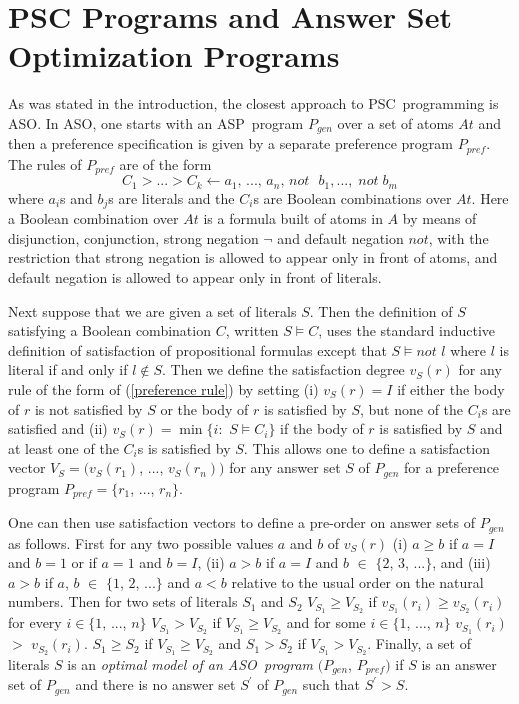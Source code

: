 \documentclass[letterpaper]{article}\usepackage{aaai}
\begin{document}
\section{PSC Programs and Answer Set Optimization Programs}

As was stated in the introduction, the closest approach to PSC\ programming is
ASO. In ASO, one starts with an ASP\ program $P_{gen}$ over a set of atoms
$At$ and then a preference specification is given by a separate preference
program $P_{pref}$. The rules of $P_{pref}$ are of the form\begin{equation}
C_{1}>...>C_{k}\leftarrow a_{1}\text{, ..., }a_{n}\text{, }not\text{ }b_{1},...,\;not\;b_{m} \label{preference rule}\end{equation}
where $a_{i}$s and $b_{j}$s are literals and the $C_{i}$s are Boolean
combinations over $At$. Here a Boolean combination over $At$ is a formula
built of atoms in $A$ by means of disjunction, conjunction, strong negation
$\lnot$ and default negation $not$, with the restriction that strong negation
is allowed to appear only in front of atoms, and default negation is allowed
to appear only in front of literals.

Next suppose that we are given a set of literals $S$. Then the definition of
$S$ satisfying a Boolean combination $C$, written $S\models C$, uses the
standard inductive definition of satisfaction of propositional formulas except
that $S\models not$ $l$ where $l$ is literal if and only if $l\notin S$. Then
we define the satisfaction degree $v_{S}\left(  r\right)  $ for any rule of
the form of (\ref{preference rule}) by setting (i) $v_{S}\left(  r\right)  =I$
if either the body of $r$ is not satisfied by $S$ or the body of $r$ is
satisfied by $S$, but none of the $C_{i}$s are satisfied and (ii)
$v_{S}\left(  r\right)  =\min\{i:$ $S\models C_{i}\}$ if the body of $r$ is
satisfied by $S$ and at least one of the $C_{i}$s is satisfied by $S$. This
allows one to define a satisfaction vector $V_{S}=(v_{S}\left(  r_{1}\right)
$, ..., $v_{S}\left(  r_{n}\right)  )$ for any answer set $S$ of $P_{gen}$ for
a preference program $P_{pref}=\{r_{1}$, ..., $r_{n}\}$.

One can then use satisfaction vectors to define a pre-order on answer sets of
$P_{gen}$ as follows. First for any two possible values $a$ and $b$ of
$v_{S}\left(  r\right)  $ (i) $a\geq b$ if $a=I$ and $b=1$ or if $a=1$ and
$b=I$, (ii) $a>b$ if $a=I$ and $b$ $\in$ $\{2$, $3$, ...$\}$, and (iii) $a>b$
if $a$, $b$ $\in$ $\{1$, $2$, ...$\}$ and $a<b$ relative to the usual order on
the natural numbers. Then for two sets of literals $S_{1}$ and $S_{2}$
$V_{S_{1}}\geq V_{S_{2}}$ if $v_{S_{1}}\left(  r_{i}\right)  \geq v_{S_{2}}\left(  r_{i}\right)  $ for every $i\in\{1$, ..., $n\}$ $V_{S_{1}}>V_{S_{2}}$
if $V_{S_{1}}\geq V_{S_{2}}$ and for some $i\in\{1$, ..., $n\}$ $v_{S_{1}}\left(  r_{i}\right)  $ $>$ $v_{S_{2}}\left(  r_{i}\right)  $. $S_{1}\geq
S_{2}$ if $V_{S_{1}}\geq V_{S_{2}}$ and $S_{1}>S_{2}$ if $V_{S_{1}}>V_{S_{2}}$. Finally, a set of literals $S$ is an \emph{optimal model of an
ASO\ program} $(P_{gen}$, $P_{pref})$ if $S$ is an answer set of $P_{gen}$ and
there is no answer set $S^{\prime}$ of $P_{gen}$ such that $S^{\prime}>S$.
\end{document}
